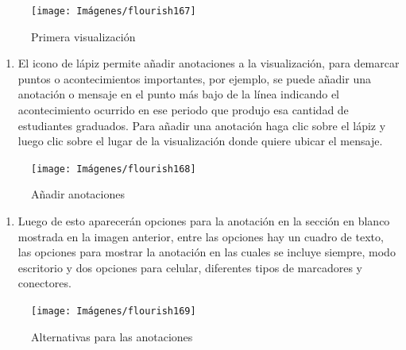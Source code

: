\documentclass[
]{book}
\providecommand{\tightlist}{%
  \setlength{\itemsep}{0pt}\setlength{\parskip}{0pt}}
\begin{document}
\begin{figure}

{\centering \texttt{[image: Imágenes/flourish167]} 

}

\caption{Primera visualización}\label{fig:paso2historiaflourish-fig}
\end{figure}

\begin{enumerate}
\def\labelenumi{\arabic{enumi}.}
\setcounter{enumi}{2}
\tightlist
\item
  El icono de lápiz permite añadir anotaciones a la visualización, para demarcar puntos o acontecimientos importantes, por ejemplo, se puede añadir una anotación o mensaje en el punto más bajo de la línea indicando el acontecimiento ocurrido en ese periodo que produjo esa cantidad de estudiantes graduados. Para añadir una anotación haga clic sobre el lápiz y luego clic sobre el lugar de la visualización donde quiere ubicar el mensaje.
\end{enumerate}

\begin{figure}

{\centering \texttt{[image: Imágenes/flourish168]} 

}

\caption{Añadir anotaciones}\label{fig:paso3historiaflourish-fig}
\end{figure}

\begin{enumerate}
\def\labelenumi{\arabic{enumi}.}
\setcounter{enumi}{3}
\tightlist
\item
  Luego de esto aparecerán opciones para la anotación en la sección en blanco mostrada en la imagen anterior, entre las opciones hay un cuadro de texto, las opciones para mostrar la anotación en las cuales se incluye siempre, modo escritorio y dos opciones para celular, diferentes tipos de marcadores y conectores.
\end{enumerate}

\begin{figure}

{\centering \texttt{[image: Imágenes/flourish169]} 

}

\caption{Alternativas para las anotaciones}\label{fig:paso4historiaflourish-fig}
\end{figure}
\end{document}
